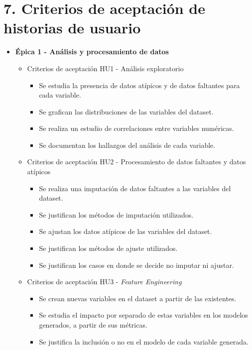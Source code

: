 \documentclass[
11pt, %
]{charter}
\begin{document}
\section{7. Criterios de aceptación de historias de usuario}
\label{sec:criteriosAceptacion}

\begin{itemize}
  \item \textbf{\'{E}pica 1 - Análisis y procesamiento de datos}
    \begin{itemize}
      \item Criterios de aceptación HU1 - Análisis exploratorio
        \begin{itemize}
            \item Se estudia la presencia de datos atípicos y de datos faltantes para cada variable.
            \item Se grafican las distribuciones de las variables del dataset.
            \item Se realiza un estudio de correlaciones entre variables numéricas.
            \item Se documentan los hallazgos del análisis de cada variable.
        \end{itemize}
      \item Criterios de aceptación HU2 - Procesamiento de datos faltantes y datos atípicos
        \begin{itemize}
            \item Se realiza una imputación de datos faltantes a las variables del dataset.
            \item Se justifican los métodos de imputación utilizados.
            \item Se ajustan los datos atípicos de las variables del dataset.
            \item Se justifican los métodos de ajuste utilizados.
            \item Se justifican los casos en donde se decide no imputar ni ajustar.
        \end{itemize}
      \item Criterios de aceptación HU3 - \textit{Feature Engineering}
        \begin{itemize}
            \item Se crean nuevas variables en el dataset a partir de las existentes.
            \item Se estudia el impacto por separado de estas variables en los modelos generados, a partir de sus métricas.
            \item Se justifica la inclusión o no en el modelo de cada variable generada.

\end{itemize}
\end{itemize}
\end{itemize}
\end{document}

